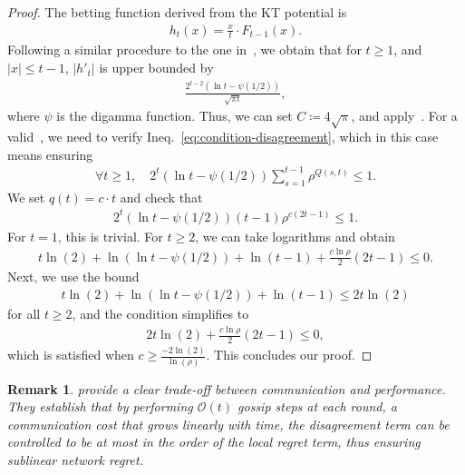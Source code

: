 \documentclass[journal]{IEEEtran} %
\newtheorem{remark}{Remark}
\newcommand{\br}[1]{\left(#1\right)}
\newcommand{\bigo}[1]{\mathcal{O}\br{#1}}
\begin{document}
\begin{proof}
    The betting function derived from the KT potential is
    \begin{align}
        h_t(x) = \frac{x}{t} \cdot F_{t-1}(x).
    \end{align}
    Following a similar procedure to the one in~, we obtain that for $t \geq 1$, and $|x| \leq t-1$, $|h'_t|$ is upper bounded by
    \begin{align}
        \frac{2^{t-2}(\ln t - \psi(1/2))}{\sqrt{\pi t}},
    \end{align}
    where $\psi$ is the digamma function.
    Thus, we can set $C\coloneqq 4\sqrt{\pi}$, and apply~.
    For a valid~, we need to verify Ineq.~\eqref{eq:condition-disagreement}, which in this case means ensuring
    \begin{align}
        \forall t \geq 1, \quad 2^{t}(\ln t - \psi(1/2)) \sum_{s=1}^{t-1} \rho^{Q(s,t)} \leq 1.
    \end{align}
    We set $q(t) = c \cdot t$ and check that
    \begin{align}
        2^{t}(\ln t - \psi(1/2)) (t-1) \rho^{c(2t-1)} \leq 1.
    \end{align}
    For $t=1$, this is trivial.
    For $t \geq 2$, we can take logarithms and obtain
    \begin{align*}
        t\ln(2) + \ln(\ln t - \psi(1/2)) + \ln(t-1) + \frac{c\ln \rho}{2}(2t-1) \leq 0.
    \end{align*}
    Next, we use the bound
    \begin{align*}
        t\ln(2) + \ln(\ln t - \psi(1/2)) + \ln(t-1) \leq 2 t \ln(2)
    \end{align*}
    for all $t \geq 2$, and the condition simplifies to
    \begin{align*}
        2 t \ln(2) + \frac{c\ln \rho}{2}(2t-1) \leq 0,
    \end{align*}
    which is satisfied when $c \geq \frac{-2\ln(2)}{\ln(\rho)}$.
    This concludes our proof.
\end{proof}

\begin{remark}
     provide a clear trade-off between communication and performance.
    They establish that by performing $\bigo{t}$ gossip steps at each round, a communication cost that grows linearly with time, the disagreement term can be controlled to be at most in the order of the local regret term, thus ensuring sublinear network regret.
\end{remark}
\end{document}
